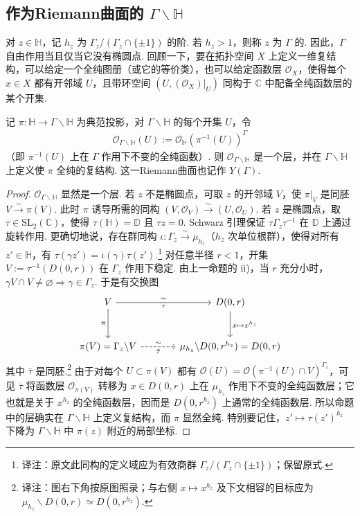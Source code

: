 \subsection{作为Riemann曲面的 $\Gamma\backslash\mathbb H$}\label{sec:modular-1-1-3}
对 $z\in\mathbb H$，记 $h_z$ 为 $\Gamma_z/(\Gamma_z\cap\{\pm1\})$ 的阶. 若 $h_z>1$，则称 $z$ 为 $\Gamma$ 的. 因此，$\Gamma$ 自由作用当且仅当它没有椭圆点.
回顾一下，要在拓扑空间 $X$ 上定义一维复结构，可以给定一个全纯图册（或它的等价类），也可以给定函数层 $\mathcal O_X$，使得每个 $x\in X$ 都有开邻域 $U$，且带环空间 $(U,(\mathcal O_X)|_U)$ 同构于 $\mathbb C$ 中配备全纯函数层的某个开集.
\begin{proposition*}
记 $\pi:\mathbb H\to\Gamma\backslash\mathbb H$ 为典范投影，对 $\Gamma\backslash\mathbb H$ 的每个开集 $U$，令
\begin{align*}
\mathcal O_{\Gamma\backslash\mathbb H}(U):=\mathcal O_{\mathbb H}(\pi^{-1}(U))^\Gamma
\end{align*}
（即 $\pi^{-1}(U)$ 上在 $\Gamma$ 作用下不变的全纯函数）. 则 $\mathcal O_{\Gamma\backslash\mathbb H}$ 是一个层，并在 $\Gamma\backslash\mathbb H$ 上定义使 $\pi$ 全纯的复结构. 这一Riemann曲面也记作 $Y(\Gamma)$.
\end{proposition*}
\begin{proof}
$\mathcal O_{\Gamma\backslash\mathbb H}$ 显然是一个层. 若 $z$ 不是椭圆点，可取 $z$ 的开邻域 $V$，使 $\pi|_V$ 是同胚 $V\xrightarrow{\sim}\pi(V)$. 此时 $\pi$ 诱导所需的同构 $(V,\mathcal O_V)\xrightarrow{\sim}(U,\mathcal O_U)$. 若 $z$ 是椭圆点，取 $\tau\in\mathrm{SL}_2(\mathbb C)$，使得 $\tau(\mathbb H)=\mathbb D$ 且 $\tau z=0$. Schwarz 引理保证 $\tau\Gamma_z\tau^{-1}$ 在 $\mathbb D$ 上通过旋转作用. 更确切地说，存在群同构 $\iota:\Gamma_z\xrightarrow{\sim}\mu_{h_z}$（$h_z$ 次单位根群），使得对所有 $z'\in\mathbb H$，有 $\tau(\gamma z')=\iota(\gamma)\tau(z')$.\footnote{译注：原文此同构的定义域应为有效商群 $\Gamma_z/(\Gamma_z\cap\{\pm1\})$；保留原式.}
对任意半径 $r<1$，开集 $V:=\tau^{-1}(D(0,r))$ 在 $\Gamma_z$ 作用下稳定. 由上一命题的 ii)，当 $r$ 充分小时，$\gamma V\cap V\ne\varnothing\Rightarrow\gamma\in\Gamma_z$. 于是有交换图
\[
\begin{tikzcd}[column sep=large,row sep=large]
V \arrow[r,"\sim","\tau"'] \arrow[d,"\pi"'] & D(0,r) \arrow[d,"x\mapsto x^{h_z}"]\\
\pi(V)=\Gamma_z\backslash V \arrow[r,dashed,"\sim","\bar\tau"'] & \mu_{h_z}\backslash D(0,r^{h_z})=D(0,r)
\end{tikzcd}
\]
其中 $\bar\tau$ 是同胚.\footnote{译注：图右下角按原图照录；与右侧 $x\mapsto x^{h_z}$ 及下文相容的目标应为 $\mu_{h_z}\backslash D(0,r)\simeq D(0,r^{h_z})$.}
由于对每个 $U\subset\pi(V)$ 都有 $\mathcal O(U)=\mathcal O(\pi^{-1}(U)\cap V)^{\Gamma_z}$，可见 $\bar\tau$ 将函数层 $\mathcal O_{\pi(V)}$ 转移为 $x\in D(0,r)$ 上在 $\mu_{h_z}$ 作用下不变的全纯函数层；它也就是关于 $x^{h_z}$ 的全纯函数层，因而是 $D(0,r^{h_z})$ 上通常的全纯函数层.
所以命题中的层确实在 $\Gamma\backslash\mathbb H$ 上定义复结构，而 $\pi$ 显然全纯. 特别要记住，$z'\mapsto\tau(z')^{h_z}$ 下降为 $\Gamma\backslash\mathbb H$ 中 $\pi(z)$ 附近的局部坐标.
\end{proof}

